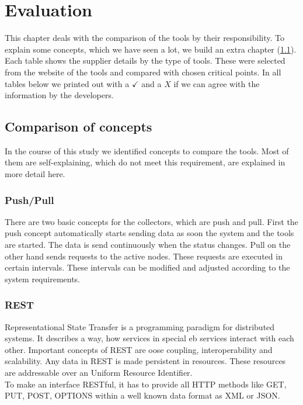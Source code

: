 \chapter{Evaluation} %
This chapter deals with the comparison of the tools by their responsibility. To explain some concepts, which we have seen a lot, we build an extra chapter (\cref{concepts}).
Each table shows the supplier details by the type of tools. These were selected from the website of the tools and compared with chosen critical points.
In all tables below we printed out with a $ \checkmark $ and a $ X $ if we can agree with the information by the developers.


\section{Comparison of concepts}
\label{concepts}
In the course of this study we identified concepts to compare the tools. Most of them are self-explaining, which do not meet this requirement, are explained in more detail here.
\subsection{Push/Pull}
\label{push/pull}
There are two basic concepts for the collectors, which are push and pull. First the push concept \cite{5557986} automatically starts sending data as soon the system and the tools are started. The data is send continuously when the status changes.
Pull \cite{5557986} on the other hand sends requests to the active nodes. These requests are executed in certain intervals. These intervals can be modified and adjusted according to the system requirements.
\subsection{REST}
\label{rest}
Representational State Transfer is a programming paradigm for distributed systems. It describes a way, how services in special eb services interact with each other. Important concepts of REST are oose coupling, interoperability and scalability. Any data in REST is made persistent in resources. These resources are addressable over an Uniform Resource Identifier. \\
To make an interface RESTful, it has to provide all HTTP methods like GET, PUT, POST, OPTIONS within a well known data format as XML or JSON.



